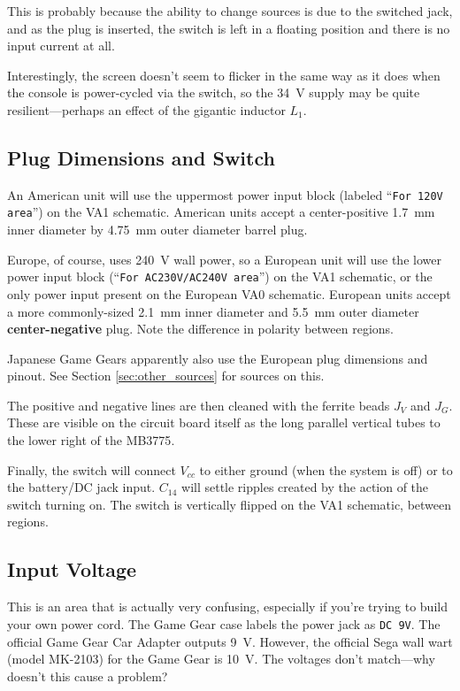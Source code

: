 \documentclass{article}
\newcommand{\Vcc}{$V_{cc}$}
\newcommand{\model}{\textsf}
\begin{document}
This is probably because the ability to change sources is due to the
switched jack, and as the plug is inserted, the switch is left in a
floating position and there is no input current at all.

Interestingly, the screen doesn't seem to flicker in the same way as
it does when the console is power-cycled via the switch, so the
\qty{34}{\volt} supply may be quite resilient---perhaps an effect of
the gigantic inductor $L_1$.

\subsection{Plug Dimensions and Switch}
\label{sec:plug_dimensions}
An American unit will use the uppermost power input block (labeled
``\texttt{For 120V area}'') on the \model{VA1} schematic. American
units accept a center-positive \qty{1.7}{\milli\meter} inner diameter
by \qty{4.75}{\milli\meter} outer diameter barrel plug.

Europe, of course, uses \qty{240}{\volt} wall power, so a European
unit will use the lower power input block (``\texttt{For AC230V/AC240V
  area}'') on the \model{VA1} schematic, or the only power input
present on the European \model{VA0} schematic. European units accept a
more commonly-sized \qty{2.1}{\milli\meter} inner diameter and
\qty{5.5}{\milli\meter} outer diameter \textbf{center-negative}
plug. Note the difference in polarity between regions.

Japanese Game Gears apparently also use the European plug dimensions
and pinout. See Section \ref{sec:other_sources} for sources on this.

The positive and negative lines are then cleaned with the ferrite
beads $J_V$ and $J_G$. These are visible on the circuit board itself
as the long parallel vertical tubes to the lower right of the
\model{MB3775}.

Finally, the switch will connect \Vcc{} to either ground (when the
system is off) or to the battery/DC jack input. $C_{14}$ will settle
ripples created by the action of the switch turning on. The switch is
vertically flipped on the \model{VA1} schematic, between regions.

\subsection{Input Voltage}
This is an area that is actually very confusing, especially if you're
trying to build your own power cord. The Game Gear case labels the
power jack as \texttt{DC 9V}. The official Game Gear Car Adapter
outputs \qty{9}{\volt}. However, the official Sega wall wart (model
\model{MK-2103}) for the Game Gear is \qty{10}{\volt}. The voltages
don't match---why doesn't this cause a problem?
\end{document}
